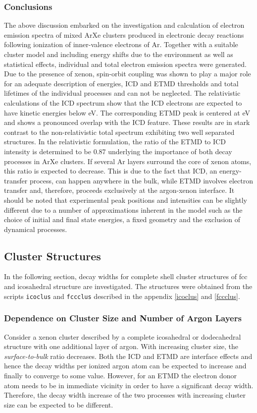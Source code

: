 \subsubsection{Conclusions}
The above discussion embarked on the investigation and calculation of electron
emission spectra of mixed ArXe clusters produced in electronic decay reactions
following ionization of inner-valence electrons of Ar.
Together with a suitable cluster model and including
energy shifts due to the environment as well as statistical effects,
individual and total electron emission spectra were generated. Due to the
presence of xenon, spin-orbit coupling was shown to play a major role for an
adequate description of energies, ICD and ETMD thresholds and total lifetimes
of the individual processes and can not be neglected. The  relativistic
calculations of the ICD spectrum show that the ICD electrons are expected to
have kinetic energies below \unit[2]{eV}. The corresponding ETMD peak is
centered at \unit[2]{eV} and shows a pronounced overlap with the ICD feature.
These results are in stark contrast to the non-relativistic total spectrum
exhibiting two well separated structures. In the relativistic formulation,
the ratio of the ETMD to ICD intensity is determined to be 0.87 underlying the
importance of both decay processes in ArXe clusters.
If several Ar layers surround the core of xenon atoms,
this ratio is expected to decrease.
This is due to the fact that ICD, an energy-transfer process, can happen
anywhere in the bulk, while ETMD involves electron transfer and, therefore,
proceeds exclusively at the argon-xenon interface. It should be noted that
experimental peak positions and intensities can be slightly different due to
a number of approximations inherent in the model such as the choice of initial
and final state energies, a fixed geometry and
the exclusion of dynamical processes.



\subsection{Cluster Structures}
In the following section, decay widths for complete shell cluster structures
of \ac{fcc} and icosahedral structure are investigated. The structures were
obtained from the scripts \verb|icoclus| and \verb|fccclus| described in
the appendix \ref{icoclus} and \ref{fccclus}.

\subsubsection{Dependence on Cluster Size and Number of Argon Layers}
Consider a xenon cluster described by a complete icosahedral or dodecahedral
structure with one additional layer of argon. With increasing cluster size,
the \emph{surface-to-bulk} ratio decreases. Both the \ac{ICD} and \ac{ETMD}
are interface
effects and hence the decay widths per ionized argon atom can be expected
to increase and finally
to converge to some value. However, for an \ac{ETMD} the electron donor atom
needs to be in immediate vicinity in order to have a significant decay
width. Therefore, the decay width increase of the two processes with increasing
cluster size can be expected to be different.


